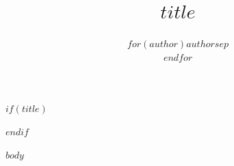 \documentclass[12pt]{article}
\title{$title$}
\author{$for(author)$$author$$sep$ \\ $endfor$}
\date{}
\begin{document}
$if(title)$
\maketitle
\date{}
$endif$

$body$
\end{document}
